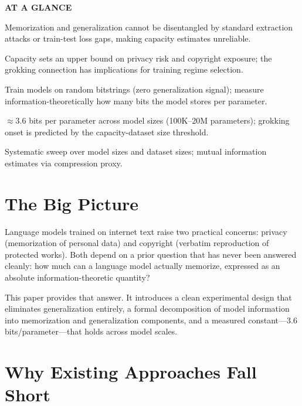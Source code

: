 \documentclass[10pt,twocolumn]{article}
\begin{document}
\begin{mdframed}[backgroundcolor=boxgray,linecolor=rulered,linewidth=1pt,
    innerleftmargin=6pt,innerrightmargin=6pt,
    innertopmargin=6pt,innerbottommargin=6pt]
\textbf{\small AT A GLANCE}\par\vspace{4pt}
\begin{description}[leftmargin=0pt,labelsep=4pt,itemsep=2pt,parsep=0pt,
    font=\small\bfseries]
  \item[Problem:] Memorization and generalization cannot be disentangled by
    standard extraction attacks or train-test loss gaps, making capacity
    estimates unreliable.
  \item[Why it matters:] Capacity sets an upper bound on privacy risk and
    copyright exposure; the grokking connection has implications for training
    regime selection.
  \item[Method:] Train models on random bitstrings (zero generalization
    signal); measure information-theoretically how many bits the model
    stores per parameter.
  \item[Result:] $\approx$3.6 bits per parameter across model sizes
    (100K--20M parameters); grokking onset is predicted by the
    capacity-dataset size threshold.
  \item[Evidence:] Systematic sweep over model sizes and dataset sizes;
    mutual information estimates via compression proxy.
\end{description}
\end{mdframed}

\section{The Big Picture}

Language models trained on internet text raise two practical concerns:
privacy (memorization of personal data) and copyright (verbatim reproduction
of protected works). Both depend on a prior question that has never been
answered cleanly: how much can a language model actually memorize, expressed
as an absolute information-theoretic quantity?

This paper provides that answer. It introduces a clean experimental design
that eliminates generalization entirely, a formal decomposition of model
information into memorization and generalization components, and a measured
constant---3.6 bits/parameter---that holds across model scales.

\section{Why Existing Approaches Fall Short}
\end{document}
